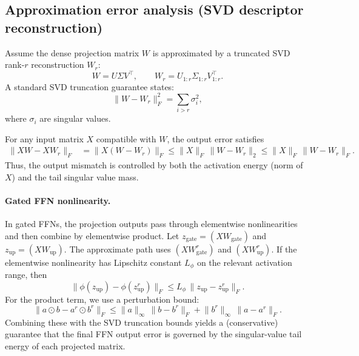 \documentclass[11pt]{article}
\begin{document}
\subsection{Approximation error analysis (SVD descriptor reconstruction)}
Assume the dense projection matrix $W$ is approximated by a truncated SVD rank-$r$ reconstruction $W_r$:
\begin{equation}
W = U\Sigma V^\top,\qquad W_r = U_{1:r}\Sigma_{1:r}V_{1:r}^\top.
\end{equation}
A standard SVD truncation guarantee states:
\begin{equation}
\lVert W - W_r\rVert_F^2 = \sum_{i>r} \sigma_i^2,
\end{equation}
where $\sigma_i$ are singular values.

For any input matrix $X$ compatible with $W$, the output error satisfies
\begin{align}
\lVert XW - XW_r\rVert_F
&= \lVert X(W-W_r)\rVert_F
\le \lVert X\rVert_F\,\lVert W-W_r\rVert_2
\le \lVert X\rVert_F\,\lVert W-W_r\rVert_F.
\end{align}
Thus, the output mismatch is controlled by both the activation energy (norm of $X$) and the tail singular value mass.

\paragraph{Gated FFN nonlinearity.}
In gated FFNs, the projection outputs pass through elementwise nonlinearities and then combine by elementwise product. Let $z_{\text{gate}}=(XW_{\text{gate}})$ and $z_{\text{up}}=(XW_{\text{up}})$. The approximate path uses $(XW_{\text{gate}}^r)$ and $(XW_{\text{up}}^r)$. If the elementwise nonlinearity has Lipschitz constant $L_{\phi}$ on the relevant activation range, then
\begin{equation}
\lVert \phi(z_{\text{up}})-\phi(z_{\text{up}}^r)\rVert_F \le L_{\phi}\,\lVert z_{\text{up}}-z_{\text{up}}^r\rVert_F.
\end{equation}
For the product term, we use a perturbation bound:
\begin{equation}
\lVert a\odot b - a^r\odot b^r\rVert_F \le \lVert a\rVert_\infty\,\lVert b-b^r\rVert_F + \lVert b^r\rVert_\infty\,\lVert a-a^r\rVert_F.
\end{equation}
Combining these with the SVD truncation bounds yields a (conservative) guarantee that the final FFN output error is governed by the singular-value tail energy of each projected matrix.
\end{document}

